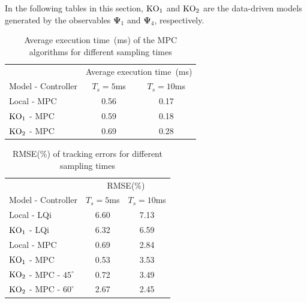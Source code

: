 In the following tables in this section, $\textup{KO}_1$ and $\textup{KO}_2$ are the data-driven models generated by the observables $\mathbf{\Psi}_1$ and $\mathbf{\Psi}_4$, respectively.
\begin{table}[H]
    \centering
    \begin{tabular}{lcc}
         \toprule
                                  & \multicolumn{2}{c}{Average execution time~(ms)}\\
        \cmidrule{2-3}
         Model - Controller       & $T_s = 5$ms  & $T_s = 10$ms\\
         \midrule
         Local - MPC               & 0.56        & 0.17\\
         $\textup{KO}_1$ - MPC    & 0.59         & 0.18\\
         $\textup{KO}_2$ - MPC    & 0.69         & 0.28\\
         \bottomrule
    \end{tabular}
    \caption{Average execution time~(ms) of the MPC algorithms for different sampling times}
    \label{tab:Exec}
\end{table}
% 
\begin{table}[H]
    \centering
    \begin{tabular}{lcc}
         \toprule
                                            & \multicolumn{2}{c}{RMSE(\%)}\\
        \cmidrule{2-3}
         Model - Controller                  & $T_s = 5$ms & $T_s = 10$ms\\
         \midrule
         Local - LQi                         & 6.60       & 7.13\\
         $\textup{KO}_1$ - LQi               & 6.32       & 6.59 \\
         Local - MPC                         & 0.69       & 2.84\\
         $\textup{KO}_1$ - MPC               & 0.53       & 3.53\\
         $\textup{KO}_2$ - MPC - $45^\circ$  & 0.72       & 3.49\\
         $\textup{KO}_2$ - MPC - $60^\circ$  & 2.67       & 2.45\\
         \bottomrule
    \end{tabular}
    \caption{RMSE(\%) of tracking errors for different sampling times}
    \label{tab:RMSE_2}
\end{table}
